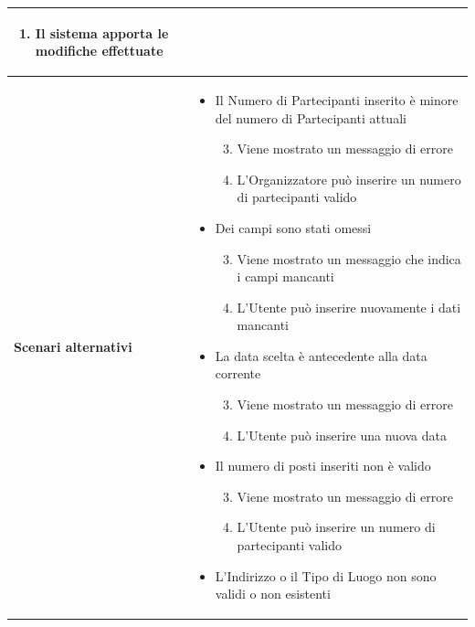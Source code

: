 \documentclass[12pt,a4paper]{report}
\begin{document}
\begin{tabularx}{\textwidth}{|X|X|}
\begin{enumerate}[nosep, leftmargin=*]
            \item Il sistema apporta le modifiche effettuate
        \end{enumerate} \\ \hline
    \textbf{Scenari alternativi} & 
        \begin{itemize}[nosep, leftmargin=*]
            \item Il Numero di Partecipanti inserito è minore del numero di Partecipanti attuali
            \begin{enumerate}[nosep, leftmargin=*]
                \setcounter{enumi}{2}
                \item Viene mostrato un messaggio di errore
                \item L'Organizzatore può inserire un numero di partecipanti valido
            \end{enumerate}
            \item Dei campi sono stati omessi
            \begin{enumerate}[nosep, leftmargin=*]
                \setcounter{enumi}{2}
                \item Viene mostrato un messaggio che indica i campi mancanti
                \item L'Utente può inserire nuovamente i dati mancanti
            \end{enumerate}
            \item La data scelta è antecedente alla data corrente
            \begin{enumerate}[nosep, leftmargin=*]
                \setcounter{enumi}{2}
                \item Viene mostrato un messaggio di errore
                \item L'Utente può inserire una nuova data
            \end{enumerate}
            \item Il numero di posti inseriti non è valido
            \begin{enumerate}[nosep, leftmargin=*]
                \setcounter{enumi}{2}
                \item Viene mostrato un messaggio di errore
                \item L'Utente può inserire un numero di partecipanti valido
            \end{enumerate}
            \item L'Indirizzo o il Tipo di Luogo non sono validi o non esistenti
            \begin{enumerate}[nosep, leftmargin=*]

\end{enumerate}
\end{itemize}
\end{tabularx}
\end{document}
